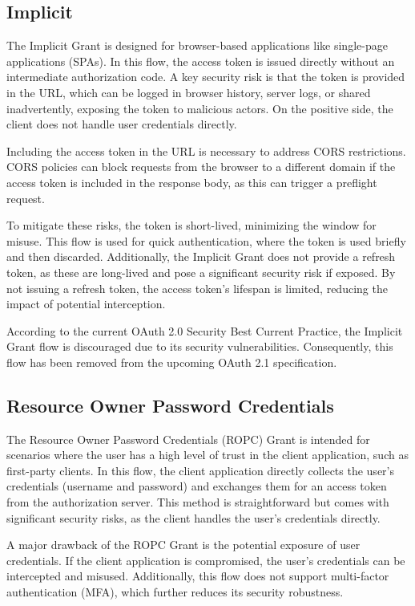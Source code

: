 \subsection*{Implicit}
The Implicit Grant is designed for browser-based applications like single-page applications (SPAs). In this flow, the access token is issued directly without an intermediate authorization code. A key security risk is that the token is provided in the URL, which can be logged in browser history, server logs, or shared inadvertently, exposing the token to malicious actors. On the positive side, the client does not handle user credentials directly.

Including the access token in the URL is necessary to address CORS restrictions. CORS policies can block requests from the browser to a different domain if the access token is included in the response body, as this can trigger a preflight request.

To mitigate these risks, the token is short-lived, minimizing the window for misuse. This flow is used for quick authentication, where the token is used briefly and then discarded. Additionally, the Implicit Grant does not provide a refresh token, as these are long-lived and pose a significant security risk if exposed. By not issuing a refresh token, the access token's lifespan is limited, reducing the impact of potential interception.

According to the current OAuth 2.0 Security Best Current Practice, the Implicit Grant flow is discouraged due to its security vulnerabilities. Consequently, this flow has been removed from the upcoming OAuth 2.1 specification.

\subsection*{Resource Owner Password Credentials}
The Resource Owner Password Credentials (ROPC) Grant is intended for scenarios where the user has a high level of trust in the client application, such as first-party clients. In this flow, the client application directly collects the user's credentials (username and password) and exchanges them for an access token from the authorization server. This method is straightforward but comes with significant security risks, as the client handles the user's credentials directly.

A major drawback of the ROPC Grant is the potential exposure of user credentials. If the client application is compromised, the user's credentials can be intercepted and misused. Additionally, this flow does not support multi-factor authentication (MFA), which further reduces its security robustness.

